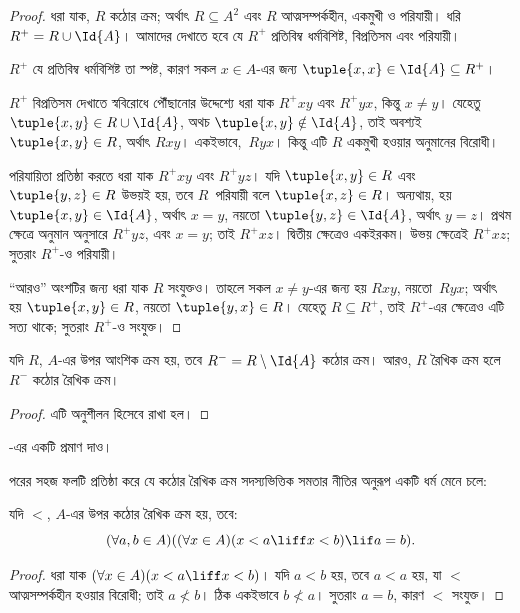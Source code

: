 \documentclass[../../../include/open-logic-section]{subfiles}
\begin{document}
\begin{proof}
ধরা যাক, $R$ কঠোর ক্রম; অর্থাৎ $R \subseteq A^2$ এবং $R$ আত্মসম্পর্কহীন, একমুখী ও পরিযায়ী। ধরি $R^+ = R \cup \Id{A}$। আমাদের দেখাতে হবে যে $R^+$ প্রতিবিম্ব ধর্মবিশিষ্ট, বিপ্রতিসম এবং পরিযায়ী।

$R^+$ যে প্রতিবিম্ব ধর্মবিশিষ্ট তা স্পষ্ট, কারণ সকল $x \in A$-এর জন্য $\tuple{x, x} \in \Id{A} \subseteq R^+$।

$R^+$ বিপ্রতিসম দেখাতে স্ববিরোধে পৌঁছানোর উদ্দেশ্যে ধরা যাক $R^+xy$ এবং $R^+yx$, কিন্তু $x \neq y$। যেহেতু $\tuple{x,y} \in R \cup \Id{A}$, অথচ $\tuple{x, y} \notin \Id{A}$, তাই অবশ্যই $\tuple{x, y} \in R$, অর্থাৎ $Rxy$। একইভাবে,~$Ryx$। কিন্তু এটি $R$ একমুখী হওয়ার অনুমানের বিরোধী।

পরিযায়িতা প্রতিষ্ঠা করতে ধরা যাক $R^+xy$ এবং $R^+yz$। যদি $\tuple{x, y} \in R$ এবং $\tuple{y,z} \in R$ উভয়ই হয়, তবে $R$~পরিযায়ী বলে $\tuple{x, z} \in R$। অন্যথায়, হয় $\tuple{x, y} \in \Id{A}$, অর্থাৎ $x = y$, নয়তো $\tuple{y, z} \in \Id{A}$, অর্থাৎ $y = z$। প্রথম ক্ষেত্রে অনুমান অনুসারে $R^+yz$, এবং $x = y$; তাই $R^+xz$। দ্বিতীয় ক্ষেত্রেও একইরকম। উভয় ক্ষেত্রেই $R^+xz$; সুতরাং $R^+$-ও পরিযায়ী।

``আরও'' অংশটির জন্য ধরা যাক $R$ সংযুক্তও। তাহলে সকল $x \neq y$-এর জন্য হয় $Rxy$, নয়তো~$Ryx$; অর্থাৎ হয় $\tuple{x, y} \in R$, নয়তো $\tuple{y, x} \in R$। যেহেতু $R \subseteq R^+$, তাই $R^+$-এর ক্ষেত্রেও এটি সত্য থাকে; সুতরাং $R^+$-ও সংযুক্ত।
\end{proof}

\begin{prop}
যদি $R$, $A$-এর উপর আংশিক ক্রম হয়, তবে $R^- = R \setminus \Id{A}$ কঠোর ক্রম। আরও, $R$ রৈখিক ক্রম হলে $R^-$ কঠোর রৈখিক ক্রম।
\end{prop}

\begin{proof}
এটি অনুশীলন হিসেবে রাখা হল।
\end{proof}

\begin{prob}
-এর একটি প্রমাণ দাও।
\end{prob}

পরের সহজ ফলটি প্রতিষ্ঠা করে যে কঠোর রৈখিক ক্রম সদস্যভিত্তিক সমতার নীতির অনুরূপ একটি ধর্ম মেনে চলে:

\begin{prop}
যদি $<$, $A$-এর উপর কঠোর রৈখিক ক্রম হয়, তবে:
\[
  (\forall a, b \in A)((\forall x \in A)(x < a \liff x < b) \lif a = b).
\]
\end{prop}

\begin{proof}
ধরা যাক $(\forall x \in A)(x < a \liff x < b)$। যদি $a < b$ হয়, তবে $a < a$ হয়, যা $<$ আত্মসম্পর্কহীন হওয়ার বিরোধী; তাই $a \nless b$। ঠিক একইভাবে $b \nless a$। সুতরাং $a = b$, কারণ $<$ সংযুক্ত।
\end{proof}
\end{document}
